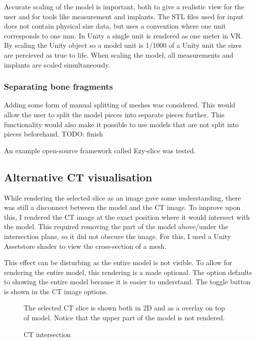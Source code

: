 \documentclass[a4paper]{report}
\begin{document}
Accurate scaling of the model is important, both to give a realistic view for the user and for tools like measurement and implants. The STL files used for input does not contain physical size data, but uses a convention where one unit corresponds to one mm. In Unity a single unit is rendered as one meter in VR. By scaling the Unity object so a model unit is 1/1000 of a Unity unit the sizes are percieved as true to life. When scaling the model, all measurements and implants are scaled simultaneously.

\subsubsection{Separating bone fragments}
Adding some form of manual splitting of meshes was considered. This would allow the user to split the model pieces into separate pieces further. This functionality would also make it possible to use models that are not split into pieces beforehand.
TODO: finish

An example open-source framework called Ezy-slice\cite{arayan_davidarayanezy-slice_2022} was tested.

\subsection{Alternative CT visualisation}
While rendering the selected slice as an image gave some understanding, there was still a disconnect between the model and the CT image. To improve upon this, I rendered the CT image at the exact position where it would intersect with the model.
This required removing the part of the model above/under the intersection plane, so it did not obscure the image. For this, I used a Unity Assetstore shader to view the cross-section of a mesh\cite{aldandarawy_unity_2019}.

This effect can be disturbing as the entire model is not visible. To allow for rendering the entire model, this rendering is a made optional. The option defaults to showing the entire model because it is easier to understand.
The toggle button is shown in the CT image options.

\begin{figure}[h!]
    \centering
	\hfill
  \caption{CT intersection}
  \small
  The selected CT slice is shown both in 2D and as a overlay on top of model. Notice that the upper part of the model is not rendered.
\end{figure}
\end{document}
